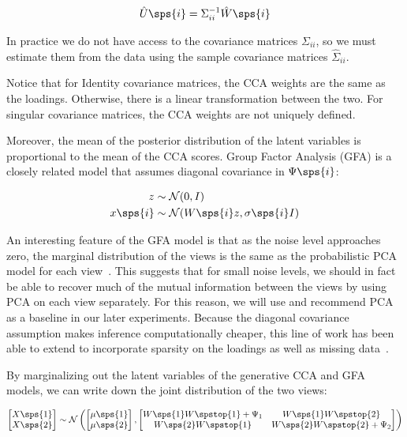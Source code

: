 \begin{align}
    \hat{U}\sps{i} = \Sigma_{ii}^{-1} \hat{W}\sps{i}
\end{align}

In practice we do not have access to the covariance matrices $\Sigma_{ii}$, so we must estimate them from the data using the sample covariance matrices $\hat{\Sigma}_{ii}$.

Notice that for Identity covariance matrices, the CCA weights are the same as the loadings.
Otherwise, there is a linear transformation between the two.
For singular covariance matrices, the CCA weights are not uniquely defined.

Moreover, the mean of the posterior distribution of the latent variables is proportional to the mean of the CCA scores\citep{klami2013bayesian}.
Group Factor Analysis (GFA) is a closely related model that assumes diagonal covariance in $\Psi\sps{i}$:

\begin{align}
    z& \sim \mathcal{N}(0, I)\\
    x\sps{i} & \sim \mathcal{N}(W\sps{i} z, \sigma\sps{i}I)
\end{align}

An interesting feature of the GFA model is that as the noise level approaches zero, the marginal distribution of the views is the same as the probabilistic PCA model for each view~\citep{tipping1999probabilistic}.
This suggests that for small noise levels, we should in fact be able to recover much of the mutual information between the views by using PCA on each view separately.
For this reason, we will use and recommend PCA as a baseline in our later experiments.
Because the diagonal covariance assumption makes inference computationally cheaper, this line of work has been able to extend to incorporate sparsity on the loadings\citep{virtanen2011bayesian} as well as missing data~\citep{ferreira2022hierarchical}.

By marginalizing out the latent variables of the generative CCA and GFA models, we can write down the joint distribution of the two views:

\begin{align}
    \begin{bmatrix} X\sps{1} \\ X\sps{2} \end{bmatrix} \sim \mathcal{N} \left( \begin{bmatrix} \mu\sps{1} \\ \mu\sps{2} \end{bmatrix}, \begin{bmatrix} W\sps{1}W\spstop{1} + \Psi_1 & W\sps{1}W\spstop{2} \\ W\sps{2}W\spstop{1} & W\sps{2}W\spstop{2} + \Psi_2 \end{bmatrix} \right)
\end{align}

